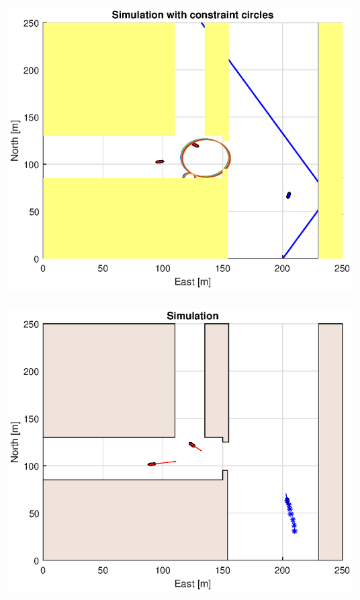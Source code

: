 \begin{figure}[!b]
\begin{subfigure}[b]{0.499\textwidth}
    \end{subfigure}
    \hfill
    \\
    \begin{subfigure}[b]{0.49\textwidth}
        \centering
        \includegraphics[width=\textwidth]{Images/Figures/Havn1/Simple0_f1_Frame3}
    \end{subfigure}
    \hfill
    \begin{subfigure}[b]{0.499\textwidth}
        \centering
        \includegraphics[width=\textwidth]{Images/Figures/Havn1/Simple0_f600_Frame3}
    \end{subfigure}
    \hfill
\end{figure}%
